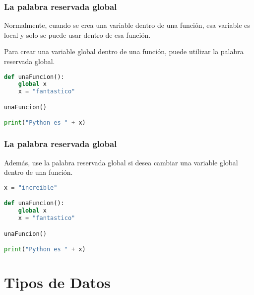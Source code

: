 \begin{frame}[fragile]
  \frametitle{La palabra reservada \textbf{global}}

  Normalmente, cuando se crea una variable dentro de una función, esa
  variable es local y solo se puede usar dentro de esa función.

  \vspace{\baselineskip}
  Para crear una variable global dentro de una función, puede utilizar
  la palabra reservada \textcolor{codeKeyword}{global}.

  \vspace{\baselineskip}
  \begin{lstlisting}[language=Python]
def unaFuncion():
    global x
    x = "fantastico"

unaFuncion()

print("Python es " + x)
  \end{lstlisting}
\end{frame}

\begin{frame}[fragile]
  \frametitle{La palabra reservada \textbf{global}}

  Además, use la palabra reservada \textcolor{codeKeyword}{global} si desea
  cambiar una variable global dentro de una función.

  \vspace{\baselineskip}
  \begin{lstlisting}[language=Python]
x = "increible"

def unaFuncion():
    global x
    x = "fantastico"

unaFuncion()

print("Python es " + x)
  \end{lstlisting}
\end{frame}

\section{Tipos de Datos}

